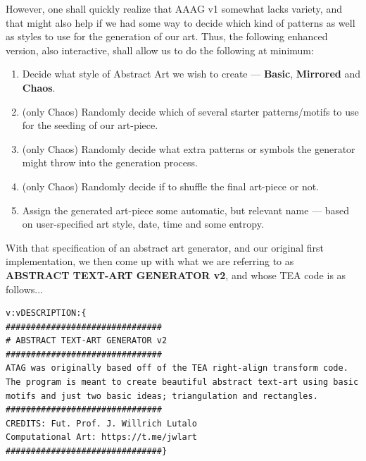 \documentclass[a4paper, 18pt]{book} %
\begin{document}
{{{\vspace{1em}

\newpage


However, one shall quickly realize that AAAG v1 somewhat lacks variety, and that might also help if we had some way to decide which kind of patterns as well as styles to use for the generation of our art. Thus, the following enhanced version, also interactive, shall allow us to do the following at minimum:

\vspace{2em}

\begin{enumerate}
\item Decide what style of Abstract Art we wish to create --- \textbf{Basic}, \textbf{Mirrored} and \textbf{Chaos}.
\item (only Chaos) Randomly decide which of several starter patterns/motifs to use for the seeding of our art-piece.
\item (only Chaos) Randomly decide what extra patterns or symbols the generator might throw into the generation process.
\item (only Chaos) Randomly decide if to shuffle the final art-piece or not.
\item Assign the generated art-piece some automatic, but relevant name --- based on user-specified art style, date, time and some entropy.
\end{enumerate}

\vspace{2em}


With that specification of an abstract art generator, and our original first implementation, we then come up with what we are referring to as \textbf{ABSTRACT TEXT-ART GENERATOR v2}, and whose TEA code  is as follows...


\vspace{2em}


{
 \Large
  \begin{tcolorbox}[teaterminalstyle, title=TEA Program: ABSTRACT TEXT-ART GENERATOR v2, breakable]
  \begin{lstlisting}[language=TEA,breaklines=true,]
v:vDESCRIPTION:{
###############################
# ABSTRACT TEXT-ART GENERATOR v2
###############################
ATAG was originally based off of the TEA right-align transform code. The program is meant to create beautiful abstract text-art using basic motifs and just two basic ideas; triangulation and rectangles. 
###############################
CREDITS: Fut. Prof. J. Willrich Lutalo 
Computational Art: https://t.me/jwlart
###############################}


\end{lstlisting}
\end{tcolorbox}}}}}
\end{document}
